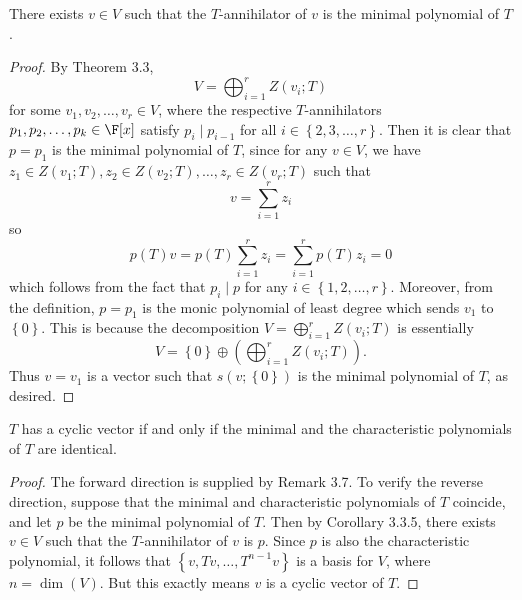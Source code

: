 \documentclass[linearalgebraII]{subfiles}
\begin{document}
    \begin{cor}{}
        There exists $v\in V$ such that the $T$-annihilator of $v$ is the minimal polynomial of $T$.
    \end{cor}	

    \begin{proof}
        By Theorem 3.3,
        \begin{equation*}
            V = \bigoplus^{r}_{i=1} Z\left( v_i;T \right) 
        \end{equation*}
        for some $v_1,v_2,\ldots,v_r\in V$, where the respective $T$-annihilators $p_1,p_2,\ldots,p_k\in\F[x]$ satisfy $p_i\mid p_{i-1}$ for all $i\in \left\lbrace 2,3,\ldots,r \right\rbrace$. Then it is clear that $p=p_1$ is the minimal polynomial of $T$, since for any $v\in V$, we have $z_1\in Z(v_1;T), z_2\in Z(v_2;T), \ldots, z_r\in Z\left( v_r;T \right)$ such that
        \begin{equation*}
            v = \sum^{r}_{i=1} z_i
        \end{equation*}
        so
        \begin{equation*}
            p(T)v = p(T)\sum^{r}_{i=1} z_i = \sum^{r}_{i=1} p(T)z_i = 0
        \end{equation*}
        which follows from the fact that $p_i\mid p$ for any $i\in \left\lbrace 1,2,\ldots,r \right\rbrace$. Moreover, from the definition, $p=p_1$ is the monic polynomial of least degree which sends $v_1$ to $\left\lbrace 0 \right\rbrace$. This is because the decomposition $V=\bigoplus^{r}_{i=1} Z\left( v_i;T \right)$ is essentially
        \begin{equation*}
            V = \left\lbrace 0 \right\rbrace \oplus \left( \bigoplus^{r}_{i=1} Z\left( v_i;T \right)  \right) .
        \end{equation*}
        Thus $v=v_1$ is a vector such that $s\left( v;\left\lbrace 0 \right\rbrace  \right) $ is the minimal polynomial of $T$, as desired.
    \end{proof}

    \begin{cor}{}
        $T$ has a cyclic vector if and only if the minimal and the characteristic polynomials of $T$ are identical.
    \end{cor}	

    \begin{proof}
        The forward direction is supplied by Remark 3.7. To verify the reverse direction, suppose that the minimal and characteristic polynomials of $T$ coincide, and let $p$ be the minimal polynomial of $T$. Then by Corollary 3.3.5, there exists $v\in V$ such that the $T$-annihilator of $v$ is $p$. Since $p$ is also the characteristic polynomial, it follows that $\left\lbrace v,Tv, \ldots, T^{n-1}v \right\rbrace$ is a basis for $V$, where $n=\dim(V)$. But this exactly means $v$ is a cyclic vector of $T$.
    \end{proof}
\end{document}
